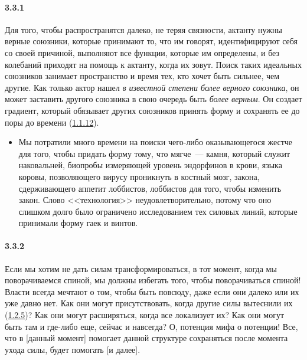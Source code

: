 \paragraph{3.3.1}\hypertarget{par:3.3.1}{} Для того, чтобы распространятся далеко, не теряя связности, актанту нужны верные союзники, которые принимают то, что им говорят, идентифицируют себя со своей причиной, выполняют все функции, которые им определены, и без колебаний приходят на помощь к актанту, когда их зовут. Поиск таких идеальных союзников занимает пространство и время тех, кто хочет быть сильнее, чем другие. Как только актор нашел {\itshape в известной степени более верного союзника}, он может заставить другого союзника в свою очередь быть {\itshape более верным}. Он создает градиент, который обязывает других союзников принять форму и сохранять ее до поры до времени (\hyperlink{par:1.1.12}{1.1.12}).
	\begin{itemize}
	\item 
	Мы потратили много времени на поиски чего-либо оказывающегося жестче для того, чтобы придать форму тому, что мягче~--- камня, который служит наковальней, биопробы измеряющей уровень эндорфинов в крови, языка коровы, позволяющего вирусу проникнуть в костный мозг, закона, сдерживающего аппетит лоббистов, лоббистов для того, чтобы изменить закон. Слово <<технология>> неудовлетворительно, потому что оно слишком долго было ограничено исследованием тех силовых линий, которые принимали форму гаек и винтов.
	\end{itemize}

\paragraph{3.3.2}\hypertarget{par:3.3.2}{} Если мы хотим не дать силам трансформироваться, в тот момент, когда мы поворачиваемся спиной, мы должны избегать того, чтобы поворачиваться спиной! Власти всегда мечтают о том, чтобы быть повсюду, даже если они далеко или их уже давно нет. Как они могут присутствовать, когда другие силы вытеснили их (\hyperlink{par:1.2.5}{1.2.5})? Как они могут расширяться, когда все локализует их? Как они могут быть там и где-либо еще, сейчас и навсегда? О, потенция мифа о потенции! Все, что в [данный момент] помогает данной структуре сохраняться после момента ухода силы, будет помогать [и далее].

